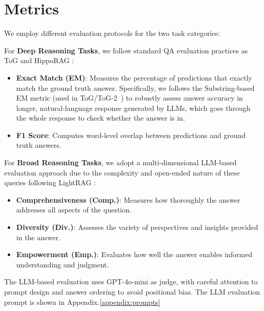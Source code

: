 \section{Metrics}
\label{appendix:metrics}

We employ different evaluation protocols for the two task categories:

For \textbf{Deep Reasoning Tasks}, we follow standard QA evaluation practices as ToG \citep{sun2023tog,ma2024tog2} and HippoRAG \citep{hipporag, gutiérrez2025HippoRAG2}:
\begin{itemize}
    \item \textbf{Exact Match (EM)}: Measures the percentage of predictions that exactly match the ground truth answer. Specifically, we follows the Substring-based EM metric (used in ToG/ToG-2~\citep{sun2023tog,ma2024tog2}) to robustly assess answer accuracy in longer, natural-language response generated by LLMs, which goes through the whole response to check whether the answer is in. 
    \item \textbf{F1 Score}: Computes word-level overlap between predictions and ground truth answers.
\end{itemize}

For \textbf{Broad Reasoning Tasks}, we adopt a multi-dimensional LLM-based evaluation approach due to the complexity and open-ended nature of these queries following LightRAG \citep{guo2024lightrag}:
\begin{itemize}
    \item \textbf{Comprehensiveness (Comp.)}: Measures how thoroughly the answer addresses all aspects of the question.
    \item \textbf{Diversity (Div.)}: Assesses the variety of perspectives and insights provided in the answer.
    \item \textbf{Empowerment (Emp.)}: Evaluates how well the answer enables informed understanding and judgment.
\end{itemize}
The LLM-based evaluation uses GPT-4o-mini as judge, with careful attention to prompt design and answer ordering to avoid positional bias. The LLM evaluation prompt is shown in Appendix.\ref{appendix:prompts}
